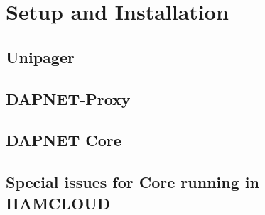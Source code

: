 \chapter{Setup and Installation}

\section{Unipager}

\section{DAPNET-Proxy}

\section{DAPNET Core}

\section{Special issues for Core running in HAMCLOUD}
